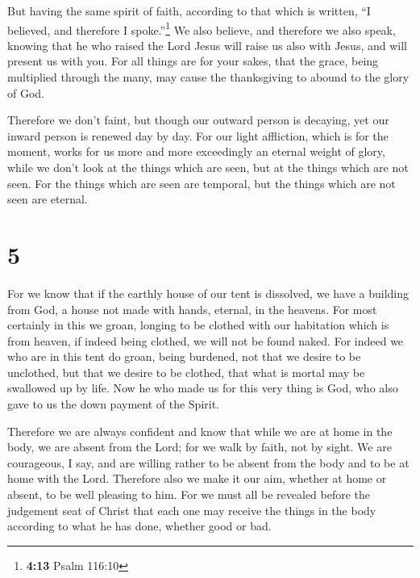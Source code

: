  But having the same spirit of faith, according to that
which is written, ``I believed, and therefore I spoke.''\footnote{\textbf{4:13}
  Psalm 116:10} We also believe, and therefore we also speak,
 knowing that he who raised the Lord Jesus will raise us
also with Jesus, and will present us with you.  For all
things are for your sakes, that the grace, being multiplied through the
many, may cause the thanksgiving to abound to the glory of God.

 Therefore we don't faint, but though our outward person
is decaying, yet our inward person is renewed day by day.
 For our light affliction, which is for the moment, works
for us more and more exceedingly an eternal weight of glory,
 while we don't look at the things which are seen, but at
the things which are not seen. For the things which are seen are
temporal, but the things which are not seen are eternal.

\hypertarget{section-4}{%
\section{5}\label{section-4}}

 For we know that if the earthly house of our tent is
dissolved, we have a building from God, a house not made with hands,
eternal, in the heavens.  For most certainly in this we
groan, longing to be clothed with our habitation which is from heaven,
 if indeed being clothed, we will not be found naked.
 For indeed we who are in this tent do groan, being
burdened, not that we desire to be unclothed, but that we desire to be
clothed, that what is mortal may be swallowed up by life. 
Now he who made us for this very thing is God, who also gave to us the
down payment of the Spirit.

 Therefore we are always confident and know that while we
are at home in the body, we are absent from the Lord;  for
we walk by faith, not by sight.  We are courageous, I say,
and are willing rather to be absent from the body and to be at home with
the Lord.  Therefore also we make it our aim, whether at
home or absent, to be well pleasing to him.  For we must
all be revealed before the judgement seat of Christ that each one may
receive the things in the body according to what he has done, whether
good or bad.

